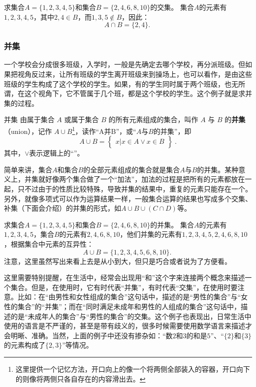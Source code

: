 \begin{example}{求集合$A=\{1,2,3,4,5\}$和集合$B=\{2,4,6,8,10\}$的交集。}
集合$A$的元素有$1,2,3,4,5$，其中$2,4\in B$，而$1,3,5\notin B$，因此：
$$
A\cap B=\{2,4\}.~
$$
\end{example}
\subsubsection{并集}

一个学校会分成很多班级，入学时，一般是先确定去哪个学校，再分派班级。但如果把视角反过来，让所有班级的学生离开班级来到操场上，也可以看作，是由这些班级的学生构成了这个学校的学生。如果，有的学生同时属于两个班级，也无所谓，在这个视角下，它不管属于几个班，都是这个学校的学生。这个例子就是求并集的过程。

\begin{definition}{并集}
由属于集合 $A$ 或属于集合 $B$ 的所有元素组成的集合，叫作 $A$ 与 $B$ 的\textbf{并集}（union），记作 $A\cup B$\footnote{这里提供一个记忆方法，开口向上的像一个将两侧全部装入的容器，开口向下的则像将两侧只各自存在的内容滑出去。}，读作“A并B”，或“$A$与$B$的并集”，即
\begin{equation}
A\cup B = \begin{Bmatrix}x|x\in A \lor x\in B\end{Bmatrix}~.
\end{equation}
其中，$\lor$表示逻辑上的“”。
\end{definition}
简单来讲，集合$A$和集合$B$的全部元素组成的集合就是集合$A$与$B$的并集。某种意义上，并集就好像两个集合做了一个“加法”，加法的过程是把所有的元素都放在一起，只不过由于的性质比较特殊，导致并集的结果中，重复的元素只能存在一个。另外，就像多项式可以作为运算结果一样，一般集合运算的结果也写成多个交集、补集（下面会介绍）的并集的形式，如$A\cup B\cup (C\cap D)$等。

\begin{example}{求集合$A=\{1,2,3,4,5\}$和集合$B=\{2,4,6,8,10\}$的并集。}\label{ex_HsSeOp_1}
集合$A$的元素有$1,2,3,4,5$，集合$B$的元素有$2,4,6,8,10$，他们并集的元素有$1,2,3,4,5,2,4,6,8,10$，根据集合中元素的互异性：
$$
A\cup B=\{1,2,3,4,5,6,8,10\}.~
$$
注意，这里虽然写出来看上去是从小到大，但只是巧合或者说为了方便看。
\end{example}

这里需要特别提醒，在生活中，经常会出现用“和”这个字来连接两个概念来描述一个集合。但是，在使用时，它有时代表“并集”，有时代表“交集”，在使用时要注意。比如：在“由男性和女性组成的集合”这句话中，描述的是“男性的集合”与“女性的集合”的“并集”；而在“同时满足未成年和男性的人组成的集合”这句话中，描述的是“未成年人的集合”与“男性的集合”的交集。这个例子也表现出，日常生活中使用的语言是不严谨的，甚至是带有歧义的，很多时候需要使用数学语言来描述才会明晰、准确。当然，上面的例子中还没有掺杂如：“数$2$和$3$的和是$5$”、“$\{2\}$和$\{3\}$的元素构成了$\{2,3\}$”等情况。

